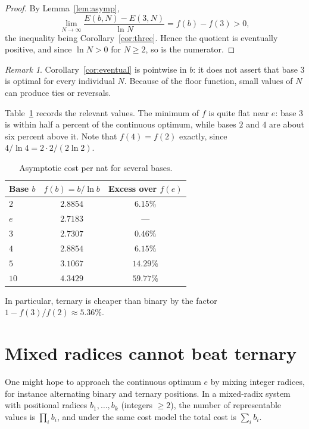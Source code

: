 \documentclass[11pt]{amsart}
\theoremstyle{definition}
\theoremstyle{remark}
\newtheorem{remark}[theorem]{Remark}
\numberwithin{equation}{section}
\begin{document}
\begin{proof}
By Lemma~\ref{lem:asymp},
\[
  \lim_{N\to\infty}\frac{E(b,N)-E(3,N)}{\ln N} = f(b)-f(3) > 0,
\]
the inequality being Corollary~\ref{cor:three}. Hence the quotient is
eventually positive, and since $\ln N>0$ for $N\ge 2$, so is the numerator.
\end{proof}

\begin{remark}
Corollary~\ref{cor:eventual} is pointwise in $b$: it does not assert that base
$3$ is optimal for every individual $N$. Because of the floor function, small
values of $N$ can produce ties or reversals.
\end{remark}

Table~\ref{tab:values} records the relevant values. The minimum of $f$ is
quite flat near $e$: base $3$ is within half a percent of the continuous
optimum, while bases $2$ and $4$ are about six percent above it. Note that
$f(4)=f(2)$ exactly, since $4/\ln 4 = 2\cdot 2/(2\ln 2)$.

\begin{table}[ht]
\centering
\begin{tabular}{@{}lcc@{}}
\toprule
Base $b$ & $f(b)=b/\ln b$ & Excess over $f(e)$ \\
\midrule
$2$ & $2.8854$ & $6.15\%$ \\
$e$ & $2.7183$ & --- \\
$3$ & $2.7307$ & $0.46\%$ \\
$4$ & $2.8854$ & $6.15\%$ \\
$5$ & $3.1067$ & $14.29\%$ \\
$10$ & $4.3429$ & $59.77\%$ \\
\bottomrule
\end{tabular}
\caption{Asymptotic cost per nat for several bases.}
\label{tab:values}
\end{table}

In particular, ternary is cheaper than binary by the factor
$1 - f(3)/f(2) \approx 5.36\%$.

\section{Mixed radices cannot beat ternary}\label{sec:mixed}

One might hope to approach the continuous optimum $e$ by mixing integer
radices, for instance alternating binary and ternary positions. In a
mixed-radix system with positional radices $b_1,\dots,b_k$ (integers
$\ge 2$), the number of representable values is $\prod_{i} b_i$, and under
the same cost model the total cost is $\sum_i b_i$.
\end{document}

